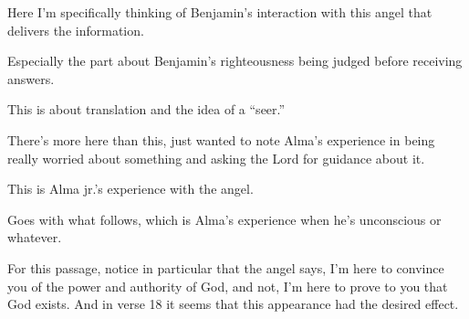 \begin{compactdesc}
\begin{compactitem}
					\item Here I'm specifically thinking of Benjamin's interaction with this angel that delivers the information.
				\end{compactitem}
			\item[{\hyperref[MOSIAH-3-4]{Mosiah 3:4}}] \phantom{.}
				\begin{compactitem}
					\item Especially the part about Benjamin's righteousness being judged before receiving answers.
				\end{compactitem}
			\item[{\hyperref[MOSIAH-4-9]{Mosiah 4:9}}]
			\item[{\hyperref[MOSIAH-4-11]{Mosiah 4:11--12}}]
			\item[{\hyperref[MOSIAH-5-2]{Mosiah 5:2--4}}]
			\item[{\hyperref[MOSIAH-8-6]{Mosiah 8:6--21}}] \phantom{.}
				\begin{compactitem}
					\item This is about translation and the idea of a ``seer.'' 
				\end{compactitem}
			\item[{\hyperref[MOSIAH-12-25]{Mosiah 12:25--27}}]
			\item[{\hyperref[MOSIAH-13-32]{Mosiah 13:32}}]
			\item[{\hyperref[MOSIAH-18-10]{Mosiah 18:10}}]
			\item[{\hyperref[MOSIAH-18-26]{Mosiah 18:26}}]
			\item[{\hyperref[MOSIAH-21-28]{Mosiah 21:28}}]
			\item[{\hyperref[MOSIAH-26-1]{Mosiah 26:1--3}}]
			\item[{\hyperref[MOSIAH-26-10]{Mosiah 26:10--13}}] \phantom{.}
				\begin{compactitem}
					\item There's more here than this, just wanted to note Alma's experience in being really worried about something and asking the Lord for guidance about it.
				\end{compactitem}
			\item[{\hyperref[MOSIAH-27-10]{Mosiah 27:10--18}}] \phantom{.}
				\begin{compactitem}
					\item This is Alma jr.'s experience with the angel.
					\item Goes with what follows, which is Alma's experience when he's unconscious or whatever.
					\item For this passage, notice in particular that the angel says, I'm here to convince you of the power and authority of God, and not, I'm here to prove to you that God exists. And in verse 18 it seems that this appearance had the desired effect.

\end{compactitem}
\end{compactdesc}
